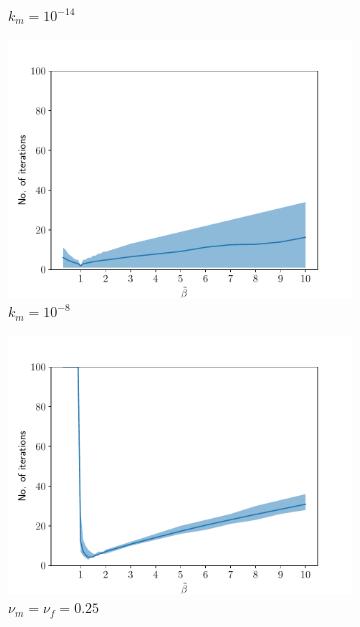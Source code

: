 \documentclass[a4paper]{article}
\numberwithin{equation}{section}
\begin{document}
\begin{figure}
\begin{subfigure}[b]{0.49\textwidth}
\caption{$k_m=10^{-14}$}
\end{subfigure}
% 
\begin{subfigure}[b]{0.49\textwidth}
\centering
\includegraphics[width=\textwidth]{figures/conv_result_linear.yaml_dt_100_alpha_1_cond_9.81e-05_Er_6e+10_Ef_1e+06_nur_0_nuf_0.pdf}
\caption{$k_m=10^{-8}$}
\end{subfigure}
% 
\begin{subfigure}[b]{0.49\textwidth}
\centering
\includegraphics[width=\textwidth]{figures/conv_result_linear.yaml_dt_100_alpha_1_cond_9.81e-18_Er_6e+10_Ef_1e+06_nur_0.25_nuf_0.25.pdf}
\caption{$\nu_m=\nu_f=0.25$}
\end{subfigure}
% 
\begin{subfigure}[b]{0.49\textwidth}

\end{subfigure}
\end{figure}
\end{document}
